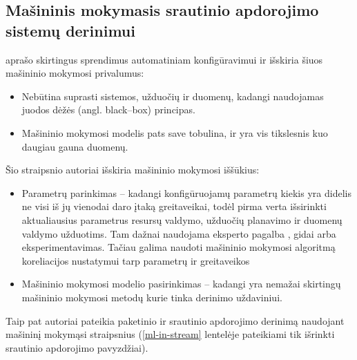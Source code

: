 \documentclass{VUMIFPSbakalaurinis}
\begin{document}
\subsection{Mašininis mokymasis srautinio apdorojimo sistemų derinimui}

\cite{herodotou2020survey} aprašo skirtingus sprendimus automatiniam konfigūravimui ir išskiria šiuos mašininio mokymosi privalumus:
\begin{itemize}
    \item Nebūtina suprasti sistemos, užduočių ir duomenų, kadangi naudojamas juodos dėžės (angl. black–box) principas.
    \item Mašininio mokymosi modelis pats save tobulina, ir yra vis tikslesnis kuo daugiau gauna duomenų. 
\end{itemize}
Šio straipsnio autoriai išskiria mašininio mokymosi iššūkius: 
\begin{itemize}
    \item Parametrų parinkimas – kadangi konfigūruojamų parametrų kiekis yra didelis \cite{Bilal2017Towards, petridis2016spark} ne visi iš jų vienodai daro įtaką greitaveikai, todėl pirma verta išsirinkti aktualiausius parametrus resursų valdymo, užduočių planavimo ir duomenų valdymo užduotims. Tam dažnai naudojama eksperto pagalba \cite{wang2016novel}, gidai arba eksperimentavimas. Tačiau galima naudoti mašininio mokymosi algoritmą koreliacijos nustatymui tarp parametrų ir greitaveikos \cite{vaquero2018autotuning, yang2012statistics}
    \item Mašininio mokymosi modelio pasirinkimas – kadangi yra nemažai skirtingų mašininio mokymosi metodų kurie tinka derinimo uždaviniui.
\end{itemize} 
Taip pat autoriai pateikia paketinio ir srautinio apdorojimo derinimą naudojant mašininį mokymąsi straipsnius (\ref{ml-in-stream} lentelėje pateikiami tik išrinkti srautinio apdorojimo pavyzdžiai).
\end{document}
